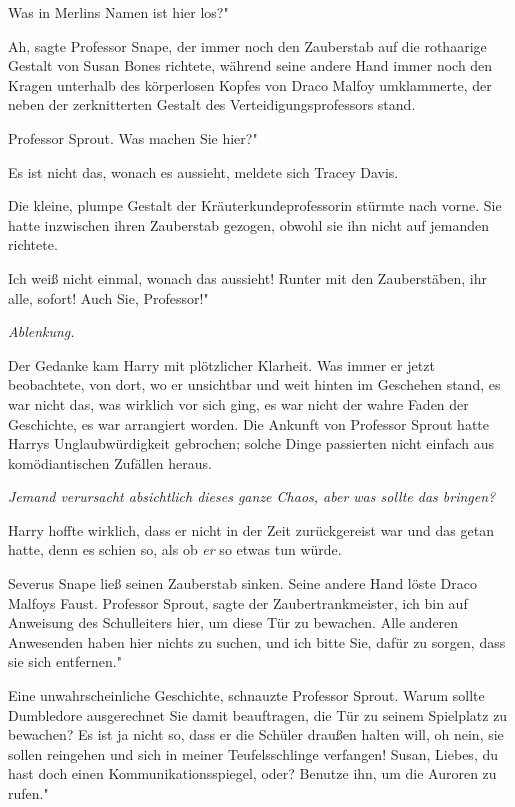 \glqq Was in Merlins Namen ist hier los?"

\glqq Ah\grqq{}, sagte Professor Snape, der immer noch den Zauberstab auf die
rothaarige Gestalt von Susan Bones richtete, während seine andere Hand immer
noch den Kragen unterhalb des körperlosen Kopfes von Draco Malfoy umklammerte,
der neben der zerknitterten Gestalt des Verteidigungsprofessors stand.

\glqq Professor Sprout. Was machen Sie hier?"

\glqq Es ist nicht das, wonach es aussieht\grqq{}, meldete sich Tracey Davis.

Die kleine, plumpe Gestalt der Kräuterkundeprofessorin stürmte nach vorne. Sie
hatte inzwischen ihren Zauberstab gezogen, obwohl sie ihn nicht auf jemanden
richtete.

\glqq Ich weiß nicht einmal, wonach das aussieht! Runter mit den Zauberstäben,
ihr alle, sofort! Auch Sie, Professor!"

\emph{Ablenkung.}

Der Gedanke kam Harry mit plötzlicher Klarheit. Was immer er jetzt beobachtete,
von dort, wo er unsichtbar und weit hinten im Geschehen stand, es war nicht das,
was wirklich vor sich ging, es war nicht der wahre Faden der Geschichte, es war
arrangiert worden. Die Ankunft von Professor Sprout hatte Harrys
Unglaubwürdigkeit gebrochen; solche Dinge passierten nicht einfach aus
komödiantischen Zufällen heraus.

\emph{Jemand verursacht absichtlich dieses ganze Chaos, aber was sollte das
bringen?}

Harry hoffte wirklich, dass er nicht in der Zeit zurückgereist war und das getan
hatte, denn es schien so, als ob \emph{er} so etwas tun würde.

Severus Snape ließ seinen Zauberstab sinken. Seine andere Hand löste Draco
Malfoys Faust. \glqq Professor Sprout\grqq{}, sagte der Zaubertrankmeister,
\glqq ich bin auf Anweisung des Schulleiters hier, um diese Tür zu bewachen.
Alle anderen Anwesenden haben hier nichts zu suchen, und ich bitte Sie, dafür zu
sorgen, dass sie sich entfernen."

\glqq Eine unwahrscheinliche Geschichte\grqq{}, schnauzte Professor Sprout.
\glqq Warum sollte Dumbledore ausgerechnet Sie damit beauftragen, die Tür zu
seinem Spielplatz zu bewachen? Es ist ja nicht so, dass er die Schüler draußen
halten will, oh nein, sie sollen reingehen und sich in meiner Teufelsschlinge
verfangen! Susan, Liebes, du hast doch einen Kommunikationsspiegel, oder?
Benutze ihn, um die Auroren zu rufen."

